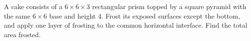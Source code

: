 A cake consists of a $6\times6\times3$ rectangular prism topped by a square pyramid with the same $6\times6$ base and height 4. Frost its exposed surfaces except the bottom, and apply one layer of frosting to the common horizontal interface. Find the total area frosted.
